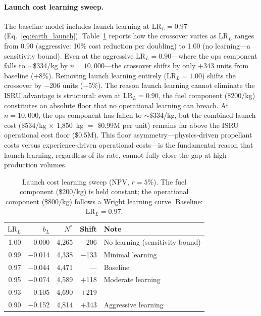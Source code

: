 \documentclass[preprint,12pt]{elsarticle}
\begin{document}
\paragraph{Launch cost learning sweep.} The baseline model includes launch learning at $\mathrm{LR}_L = 0.97$ (Eq.~\ref{eq:earth_launch}). Table~\ref{tab:launch_learning} reports how the crossover varies as $\mathrm{LR}_L$ ranges from 0.90 (aggressive: 10\% cost reduction per doubling) to 1.00 (no learning---a sensitivity bound). Even at the aggressive $\mathrm{LR}_L = 0.90$---where the ops component falls to $\sim$\$334/kg by $n = 10{,}000$---the crossover shifts by only $+$343 units from baseline (+8\%). Removing launch learning entirely ($\mathrm{LR}_L = 1.00$) shifts the crossover by $-$206 units ($-$5\%). The reason launch learning cannot eliminate the ISRU advantage is structural: even at $\mathrm{LR}_L = 0.90$, the fuel component (\$200/kg) constitutes an absolute floor that no operational learning can breach. At $n = 10{,}000$, the ops component has fallen to $\sim$\$334/kg, but the combined launch cost (\$534/kg $\times$ 1{,}850~kg $=$ \$0.99M per unit) remains far above the ISRU operational cost floor (\$0.5M). This floor asymmetry---physics-driven propellant costs versus experience-driven operational costs---is the fundamental reason that launch learning, regardless of its rate, cannot fully close the gap at high production volumes.

\begin{table}[htbp]
\centering
\caption{Launch cost learning sweep (NPV, $r = 5\%$). The fuel component (\$200/kg) is held constant; the operational component (\$800/kg) follows a Wright learning curve. Baseline: $\mathrm{LR}_L = 0.97$.}
\label{tab:launch_learning}
\small
\begin{tabular}{@{}rrrrl@{}}
\toprule
$\mathrm{LR}_L$ & $b_L$ & $N^*$ & Shift & Note \\
\midrule
1.00 & 0.000  & 4{,}265 & $-$206 & No learning (sensitivity bound) \\
0.99 & $-$0.014 & 4{,}338 & $-$133 & Minimal learning \\
0.97 & $-$0.044 & 4{,}471 & ---    & Baseline \\
0.95 & $-$0.074 & 4{,}589 & $+$118 & Moderate learning \\
0.93 & $-$0.105 & 4{,}690 & $+$219 & \\
0.90 & $-$0.152 & 4{,}814 & $+$343 & Aggressive learning \\
\bottomrule
\end{tabular}
\end{table}
\end{document}
